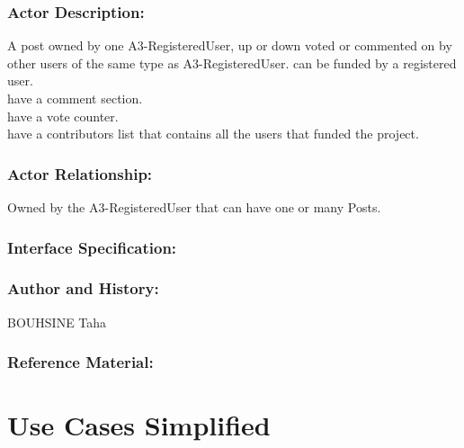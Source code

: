 \documentclass[11pt, openany]{report}
\begin{document}
\subsubsection{Actor Description:}
A post owned by one A3-RegisteredUser, up or down voted or commented on by other users of the same type as A3-RegisteredUser.
can be funded by a registered user.\\
have a comment section.\\
have a vote counter.\\
have a contributors list that contains all the users that funded the project.\\

\subsubsection{Actor Relationship:}
Owned by the A3-RegisteredUser that can have one or many Posts.
\subsubsection{Interface Specification:}
\subsubsection{Author and History:}
BOUHSINE Taha
\subsubsection{Reference Material:}

\clearpage

\section{Use Cases Simplified}
\
\end{document}

